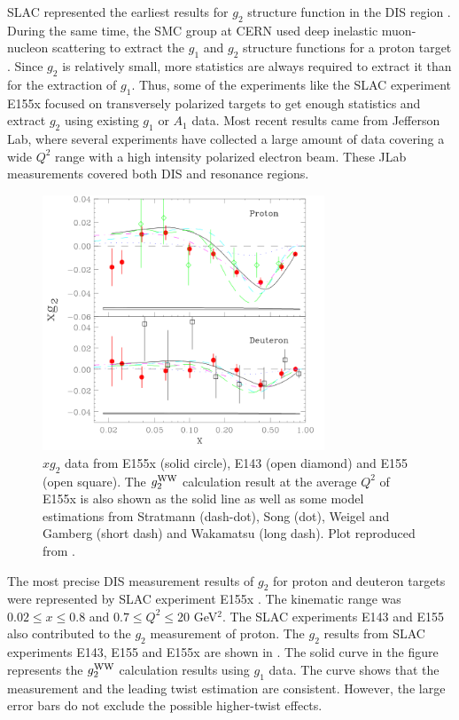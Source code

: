 SLAC represented the earliest results for $g_2$ structure function in the DIS region \cite{Anthony1996}. During the same time, the SMC group at CERN used deep inelastic muon-nucleon scattering to extract the $g_1$ and $g_2$ structure functions for a proton target \cite{Adams1997}. Since $g_2$ is relatively small, more statistics are always required to extract it than for the extraction of $g_1$. Thus, some of the experiments like the SLAC experiment E155x \cite{Anthony2003} focused on transversely polarized targets to get enough statistics and extract $g_2$ using existing $g_1$ or $A_1$ data. Most recent results came from Jefferson Lab, where several experiments have collected a large amount of data covering a wide $Q^2$ range with a high intensity polarized electron beam. These JLab measurements covered both DIS and resonance regions.

\begin{figure}[b!]
  \centering
  \includegraphics[width=0.75\textwidth]{figs/xg2p_E155x.png}
  \caption[$xg_2$ data from SLAC E155x, E143 and E155.]{$xg_2$ data from E155x (solid circle), E143 (open diamond) and E155 (open square). The $g_2^{\mathrm{WW}}$ calculation result at the average $Q^2$ of E155x is also shown as the solid line as well as some model estimations from Stratmann \cite{Stratmann1993} (dash-dot), Song \cite{Song1996}(dot), Weigel and Gamberg \cite{Weigel2001} (short dash) and Wakamatsu \cite{Wakamatsu2000} (long dash). Plot reproduced from \cite{Anthony2003}. \label{C4S1F1}}
\end{figure}

The most precise DIS measurement results of $g_2$ for proton and deuteron targets were represented by SLAC experiment E155x \cite{Anthony2003}. The kinematic range was $0.02\leq x\leq 0.8$ and $0.7\leq Q^2 \leq 20$ GeV${}^2$. The SLAC experiments E143 \cite{Abe1998} and E155 \cite{Anthony2003} also contributed to the $g_2$ measurement of proton. The $g_2$ results from SLAC experiments E143, E155 and E155x are shown in . The solid curve in the figure represents the $g_2^{\mathrm{WW}}$ calculation results using $g_1$ data. The curve shows that the measurement and the leading twist estimation are consistent. However, the large error bars do not exclude the possible higher-twist effects.

